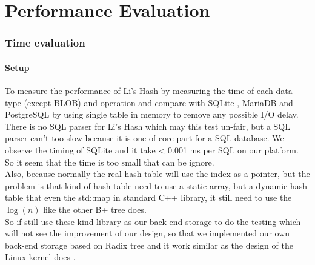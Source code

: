 \chapter{Performance Evaluation}
\label{chapter:performance-evaluation}

\baselineskip=26pt
\thispagestyle{empty}

\subsection{Time evaluation}

\subsubsection{Setup}

To measure the performance of Li's Hash by measuring the time of each data type (except BLOB) and operation and compare with SQLite \cite{web:sqlite:home-page}, MariaDB \cite{web:mariadb:home-page} and PostgreSQL \cite{web:postgresql:home-page} by using single table in memory to remove any possible I/O delay.\\

There is no SQL parser for Li's Hash which may this test un-fair, but a SQL parser can't too slow because it is one of core part for a SQL database. We observe the timing of SQLite and it take < 0.001 ms per SQL on our platform. So it seem that the time is too small that can be ignore.\\

Also, because normally the real hash table will use the index as a pointer, but the problem is that kind of hash table need to use a static array, but a dynamic hash table that even the std::map in standard C++ library, it still need to use the $\log(n)$ like the other B+ tree does.\\

So if still use these kind library as our back-end storage to do the testing which will not see the improvement of our design, so that we implemented our own back-end storage based on Radix tree \cite{web:wiki:radix-tree} and it work similar as the design of the Linux kernel does \cite{web:linux-kernel:radix-tree}.\\


